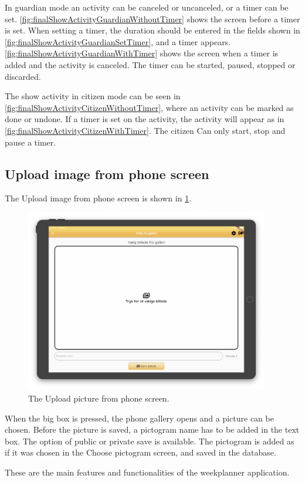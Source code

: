 In guardian mode an activity can be canceled or uncanceled, or a timer can be set. \ref{fig:finalShowActivityGuardianWithoutTimer} shows the screen before a timer is set. When setting a timer, the duration should be entered in the fields shown in \ref{fig:finalShowActivityGuardianSetTimer}, and a timer appears. \ref{fig:finalShowActivityGuardianWithTimer} shows the screen when a timer is added and the activity is canceled. The timer can be started, paused, stopped or discarded.

The show activity in citizen mode can be seen in \ref{fig:finalShowActivityCitizenWithoutTimer}, where an activity can be marked as done or undone. If a timer is set on the activity, the activity will appear as in \ref{fig:finalShowActivityCitizenWithTimer}. The citizen Can only start, stop and pause a timer.

\subsection{Upload image from phone screen}

The Upload image from phone screen is shown in \ref{fig:finalUploadPicture}.
\begin{figure}[H]
    \begin{center}
        \includegraphics[width=0.95\textwidth]{figures/FinalScreen/addPictogramFromGalleryScreen.png}
    \end{center}
    \caption{The Upload picture from phone screen.}
    \label{fig:finalUploadPicture}
\end{figure}

When the big box is pressed, the phone gallery opens and a picture can be chosen. Before the picture is saved, a pictogram name has to be added in the text box. The option of public or private save is available. The pictogram is added as if it was chosen in the Choose pictogram screen, and saved in the database.

These are the main features and functionalities of the weekplanner application.